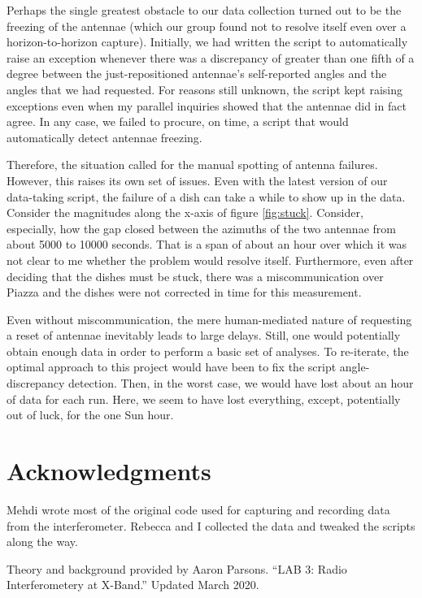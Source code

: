 \documentclass[12pt]{article}
\begin{document}
\quad \quad Perhaps the single greatest obstacle to our data collection turned out to be the freezing of the antennae (which our group found not to resolve itself even over a horizon-to-horizon capture). Initially, we had written the script to automatically raise an exception whenever there was a discrepancy of greater than one fifth of a degree between the just-repositioned antennae's self-reported angles and the angles that we had requested. For reasons still unknown, the script kept raising exceptions even when my parallel inquiries showed that the antennae did in fact agree. In any case, we failed to procure, on time, a script that would automatically detect antennae freezing.
 
Therefore, the situation called for the manual spotting of antenna failures. However, this raises its own set of issues. Even with the latest version of our data-taking script, the failure of a dish can take a while to show up in the data. Consider the magnitudes along the x-axis of figure \ref{fig:stuck}. Consider, especially, how the gap closed between the azimuths of the two antennae from about 5000 to 10000 seconds. That is a span of about an hour over which it was not clear to me whether the problem would resolve itself. Furthermore, even after deciding that the dishes must be stuck, there was a miscommunication over Piazza and the dishes were not corrected in time for this measurement.
 
Even without miscommunication, the mere human-mediated nature of requesting a reset of antennae inevitably leads to large delays. Still, one would potentially obtain enough data in order to perform   a basic set of analyses. To re-iterate, the optimal approach to this project would have been to fix the script angle-discrepancy detection. Then, in the worst case, we would have lost about an hour of data for each run. Here, we seem to have lost everything, except, potentially out of luck, for the one Sun hour.

\section{Acknowledgments}

\quad \quad Mehdi wrote most of the original code used for capturing and recording data from the interferometer. Rebecca and I collected the data and tweaked the scripts along the way.

Theory and background provided by Aaron Parsons. ``LAB 3: Radio Interferometery at X-Band.'' Updated March 2020.
\end{document}

